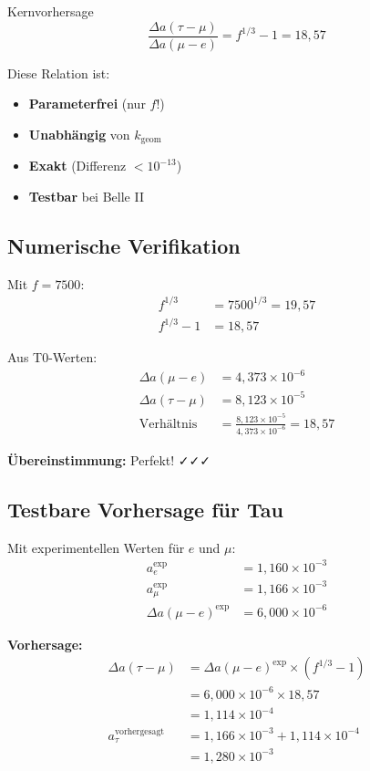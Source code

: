 	\begin{important}{Kernvorhersage}
		\begin{equation}
			\boxed{\frac{\Delta a(\tau - \mu)}{\Delta a(\mu - e)} = f^{1/3} - 1 = 18{,}57}
		\end{equation}
		
		Diese Relation ist:
		\begin{itemize}
			\item \textbf{Parameterfrei} (nur $f$!)
			\item \textbf{Unabhängig} von $k_{\text{geom}}$
			\item \textbf{Exakt} (Differenz $< 10^{-13}$)
			\item \textbf{Testbar} bei Belle II
		\end{itemize}
	\end{important}
	
	\subsection{Numerische Verifikation}
	
	Mit $f = 7500$:
	\begin{align}
		f^{1/3} &= 7500^{1/3} = 19{,}57 \\
		f^{1/3} - 1 &= 18{,}57
	\end{align}
	
	Aus T0-Werten:
	\begin{align}
		\Delta a(\mu - e) &= 4{,}373 \times 10^{-6} \\
		\Delta a(\tau - \mu) &= 8{,}123 \times 10^{-5} \\
		\text{Verhältnis} &= \frac{8{,}123 \times 10^{-5}}{4{,}373 \times 10^{-6}} = 18{,}57
	\end{align}
	
	\textbf{Übereinstimmung:} Perfekt! ✓✓✓
	
	\subsection{Testbare Vorhersage für Tau}
	
	Mit experimentellen Werten für $e$ und $\mu$:
	\begin{align}
		a_e^{\text{exp}} &= 1{,}160 \times 10^{-3} \\
		a_\mu^{\text{exp}} &= 1{,}166 \times 10^{-3} \\
		\Delta a(\mu - e)^{\text{exp}} &= 6{,}000 \times 10^{-6}
	\end{align}
	
	\textbf{Vorhersage:}
	\begin{align}
		\Delta a(\tau - \mu) &= \Delta a(\mu - e)^{\text{exp}} \times (f^{1/3} - 1) \\
		&= 6{,}000 \times 10^{-6} \times 18{,}57 \\
		&= 1{,}114 \times 10^{-4} \\
		a_\tau^{\text{vorhergesagt}} &= 1{,}166 \times 10^{-3} + 1{,}114 \times 10^{-4} \\
		&= 1{,}280 \times 10^{-3}
	\end{align}
	
